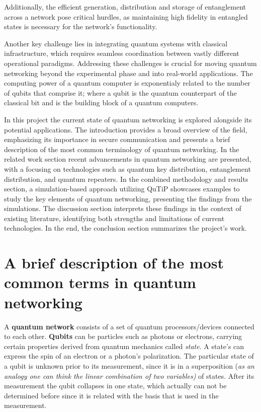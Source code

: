 \documentclass[12pt,a4paper] {report}
\begin{document}
		Additionally, the efficient generation, distribution and storage of entanglement 
		across a network pose critical hurdles, as maintaining high fidelity in entangled
		states is necessary for the network's functionality.

		Another key challenge lies in integrating
	        quantum systems with classical infrastructure,
	        which requires seamless coordination between
	        vastly different operational paradigms.
	        Addressing these challenges is crucial for moving quantum
		networking beyond the experimental
		phase and into real-world applications.
		The computing power of a quantum computer is exponentialy
		related to the number of qubits that comprise it;
		where a qubit is the quantum counterpart of the classical bit and is the building block of a quantum computers.


		In this project the current state of quantum networking is explored alongside its potential applications. 
		The introduction provides a broad overview of the field, emphasizing its importance in secure communication and presents a brief
		description of the most common terminology of quantum networking.	
		In the related work section recent advancements in quantum networking are presented, with a focusing on technologies such as 
		quantum key distribution, entanglement distribution, and quantum repeaters. 
		In the combined methodology and results section, a simulation-based approach utilizing QuTiP 
		showcases examples to study the key elements of quantum networking, presenting the findings from the simulations.
		The discussion section interprets these findings in the context of existing literature, 
		identifying both strengths and limitations of current technologies. 
		In the end, the conclusion section summarizes the project's work.


		\section{A brief description of the most common terms in quantum networking}

		A \textbf{quantum network} consists of a set of quantum processors/devices connected to each other. \textbf{Qubits} can be particles such as photons
		or electrons, carrying certain properties derived from quantum mechanics called \textit{state}. A state's can express the spin of an electron or
		a photon's polarization. The particular state of a qubit is unknown prior to its measurement, since it is in a 
		superposition (\textit{as an analogy one can think the linear combination of two variables)} of states.
		After its measurement the qubit collapses in one state, which actually can not be determined
		before since it is related with the basis that is used in the measurement.
		
\end{document}
